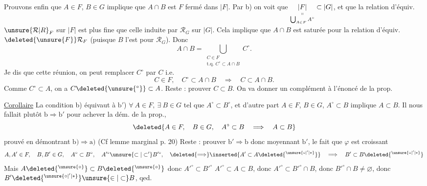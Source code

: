 Prouvons enfin que $A\in F$, $B\in G$ implique que $A\cap B$ est $F$ fermé dans $|F|$. Par b) on voit que $\underset{\substack{\shortparallel\\ \bigcup_{A\in F}A^\circ}}{|F|}\subset|G|$, et que
la relation d'équiv. $\unsure{\mathcal R|R}_F$ sur $|F|$ est plus fine que celle induite par $\mathcal R_G$ sur $|G|$. Cela implique que $A\cap B$ est saturée pour la relation d'équiv. $\deleted{\unsure{F}}\mathcal R_F$ (puisque $B$ l'est pour $\mathcal R_G$). Donc
\[ A\cap B=\bigcup_{\substack{C\in F\\ \text{t.q. } C^\circ\subset A\cap B}} C^\circ . \]
Je dis que  cette réunion,  on peut remplacer $C^\circ$ par $C$ i.e.
\[ C\in F,\quad C^\circ\subset A\cap B\quad\Longrightarrow\quad C\subset A\cap B. \]
Comme $C^\circ\subset A$, on a $C\deleted{\unsure{{}^\circ}}\subset A$. Reste : prouver $C\subset B$. On va donner un complément  à l'énoncé de la prop.

\uline{Corollaire} La condition b) équivaut à
$\mathrm{b}'$) $\forall\ A\in F,\ \exists\ B\in G$ tel que $A^\circ\subset B^\circ$, et d'autre part $A\in F$, $B\in G$, $A^\circ\subset B$ implique $A\subset B$.
Il nous fallait plutôt $\mathrm b\Rightarrow\mathrm b'$ pour achever la dém. de la prop.,    
\[ \deleted{A\in F,\quad B\in G,\quad A^\circ\subset B\quad\Longrightarrow\quad A\subset B} \]
 prouvé en démontrant $\mathrm b)\Rightarrow\mathrm a)$ (Cf lemme marginal p. 20) Reste : prouver $\mathrm b'\Rightarrow\mathrm b$ donc moyennant $\mathrm{b}'$, le fait que $\varphi$ est croissant
\[ A,A'\in F,\quad B,B'\in G,\quad A^\circ\subset B^\circ,\quad A'^\circ\unsure{\subset|\subset'}B'^\circ,\quad \deleted{\Longrightarrow}\inserted{A'\subset A\deleted{{}^{\unsure{\circ|'|*}}}}\quad\Longrightarrow\quad B'\subset B\deleted{{}^{\unsure{\circ|'|*}}} \]
Mais      $A\deleted{{}^{\unsure{\circ}}}\subset B\deleted{{}^{\unsure{\circ}}}$   donc $A'^\circ\subset B'^\circ$ 
$A'^\circ\subset A\subset B$, donc $A'^\circ\subset B'^\circ\cap B$, donc $B'^\circ\cap B\ne\varnothing$, donc $B'\deleted{{}^{\unsure{\circ|'|*}}}\unsure{\in|\subset}B$, qed.

